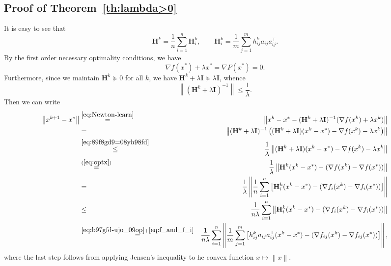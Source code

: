 \documentclass[12pt]{article}
\newcommand{\norm}[1]{\left\|#1\right\|}
\newcommand{\mH}{\mathbf{H}}
\newcommand{\mI}{\mathbf{I}}
\begin{document}
\subsection{Proof of Theorem~\ref{th:lambda>0}}


It is easy to see that \begin{equation}\label{eq:b97gfd-ujo_09op}\mH^k = \frac{1}{n} \sum_{i=1}^n \mH^k_i, \qquad \mH^k_i = \frac{1}{m} \sum_{j=1}^{m} h^k_{ij} a_{ij}a_{ij}^\top .\end{equation}
By the first order necessary optimality conditions, we have
\begin{equation}\label{eq:optx}
\nabla f(x^*) + \lambda x^*  = \nabla P(x^*)= 0. 
\end{equation}
Furthermore, since we maintain $\mH^k \succeq 0$ for all $k$, we have $\mH^k + \lambda \mI \succeq \lambda \mI$, whence  \begin{equation}\label{eq:89f8gd9=08yh98fd}\norm{\left(\mH^k + \lambda \mI \right)^{-1}} \leq \frac{1}{\lambda}.\end{equation}
Then we can write
\begin{eqnarray}
	\norm{ x^{k+1} - x^* } &\overset{\eqref{eq:Newton-learn}}{=}& \norm{ x^k - x^* - (\mH^k + \lambda \mI)^{-1} (\nabla f(x^k) + \lambda x^k) }\notag  \\
	&=& \norm{ (\mH^k + \lambda \mI)^{-1} \left(  (\mH^k + \lambda \mI)(x^k - x^*) - \nabla f(x^k) - \lambda x^k  \right) } \notag \\ 
	&\overset{\eqref{eq:89f8gd9=08yh98fd}}{\leq}& \frac{1}{\lambda} \norm{  (\mH^k + \lambda \mI)(x^k - x^*) - \nabla f(x^k) - \lambda x^k  } \notag \\ 
	&\overset{(\ref{eq:optx})}{=}& \frac{1}{\lambda} \norm{ \mH^k (x^k - x^*) - (\nabla f(x^k) - \nabla f(x^*)) } \notag \\ 
	&=& \frac{1}{\lambda} \norm{ \frac{1}{n} \sum_{i=1}^n \left[\mH_i^k (x^k - x^*) - (\nabla f_i(x^k) - \nabla f_i(x^*)) \right]}\notag  \\ 
	&\leq& \frac{1}{n \lambda} \sum_{i=1}^n \norm{ \mH_i^k (x^k - x^*) - (\nabla f_i(x^k) - \nabla f_i(x^*)) } \notag  \\
	&\overset{\eqref{eq:b97gfd-ujo_09op}+\eqref{eq:f_and_f_i} }{=}& \frac{1}{n \lambda} \sum_{i=1}^n \norm{ \frac{1}{m} \sum_{j=1}^m  \left[ h_{ij}^k a_{ij} a_{ij}^\top (x^k - x^*) - (\nabla f_{ij}(x^k) - \nabla f_{ij}(x^*)) \right] },\label{eq:pop_us_lop_989f}
	\end{eqnarray}
	where the last step follows from applying Jensen's inequality to he convex function $x\mapsto \norm{x}$. 
\end{document}

